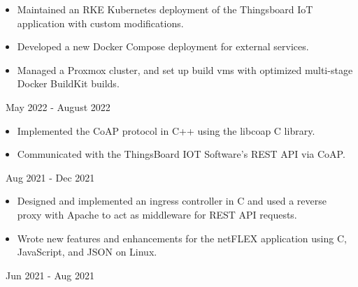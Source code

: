 \documentclass[11pt,letterpaper,ragged2e]{altacv}
\begin{document}

\begin{fullwidth}
  \makecvheader
\end{fullwidth}




{
  \begin{itemize}
    \item Maintained an RKE Kubernetes deployment of the Thingsboard IoT application with custom modifications.
    \item Developed a new Docker Compose deployment for external services.
    \item Managed a Proxmox cluster, and set up build vms with optimized multi-stage Docker BuildKit builds.
  \end{itemize}
}
{\faCalendar\, May 2022 - August 2022}
{
}

{
  \begin{itemize}
    \item Implemented the CoAP protocol in C++ using the libcoap C library.
    \item Communicated with the ThingsBoard IOT Software's REST API via CoAP.
  \end{itemize}
}
{\faCalendar\, Aug 2021 - Dec 2021}
{
}

{
  \begin{itemize}
    \item Designed and implemented an ingress controller in C and used a reverse proxy with Apache to act as middleware for REST API requests.
    \item Wrote new features and enhancements for the netFLEX application using C,  JavaScript, and JSON on Linux.
  \end{itemize}
}
{\faCalendar\, Jun 2021 - Aug 2021}
{
}
\end{document}
